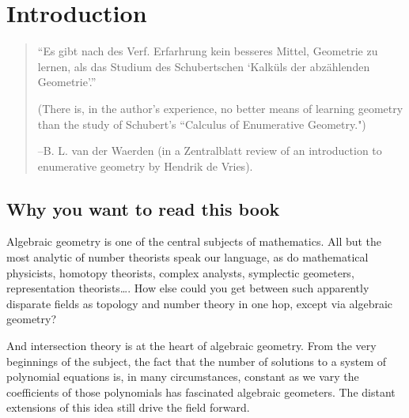 

\setlength{\parskip}{5pt}

\addtocounter{chapter}{-1}
\chapter{Introduction}
\label{IntroChapter}

\begin{quote}
\small\sf
``Es gibt nach des Verf. Erfarhrung kein besseres Mittel, Geometrie zu lernen, als
das Studium des Schubertschen `Kalk\"uls der abz\"ahlenden Geometrie'.''

(There is, in the author's experience, no better means of learning geometry than
the study of Schubert's ``Calculus of Enumerative Geometry.")

--B. L. van der Waerden (in a Zentralblatt review of an introduction to enumerative geometry
by Hendrik de Vries).
\bigskip

\end{quote}


%


\section{Why you want to read this book}

Algebraic geometry is one of the central subjects of mathematics. All but the most analytic of number theorists speak our language, as do mathematical physicists, homotopy theorists, complex analysts, symplectic geometers, representation theorists\dots. How else could you get between such apparently disparate fields as topology and number theory in one hop, except via algebraic geometry?

And intersection theory is at the heart of algebraic geometry. From the very beginnings of the subject, the fact that the number of solutions to a system of polynomial equations is, in many circumstances, constant as we vary the coefficients of those polynomials has fascinated algebraic geometers. The distant extensions of this idea still drive the field forward.


